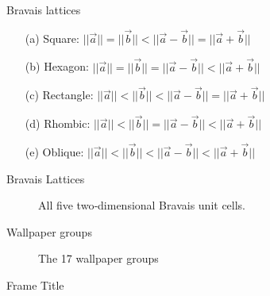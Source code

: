 \documentclass{beamer}
\theoremstyle{definition}
\begin{document}
\begin{frame}{Bravais lattices}
    \begin{enumerate}
        \item[(a)] Square:\hspace*{14pt} $||\vec{a}||=||\vec{b}|| < ||\vec{a}-\vec{b}|| = ||\vec{a}+\vec{b}||$

        \item[(b)] Hexagon:\hspace*{7pt} $||\vec{a}||=||\vec{b}|| = ||\vec{a}-\vec{b}|| < ||\vec{a}+\vec{b}||$

        \item[(c)] Rectangle: $||\vec{a}||<||\vec{b}|| < ||\vec{a}-\vec{b}|| = ||\vec{a}+\vec{b}||$

        \item[(d)] Rhombic:\hspace*{5pt} $||\vec{a}||<||\vec{b}|| = ||\vec{a}-\vec{b}|| < ||\vec{a}+\vec{b}||$

        \item[(e)] Oblique:\hspace*{9pt} $||\vec{a}||<||\vec{b}|| < ||\vec{a}-\vec{b}|| < ||\vec{a}+\vec{b}||$
    \end{enumerate}
\end{frame}

\begin{frame}{Bravais Lattices}
    \begin{figure}
        \centering
        
        \caption{All five two‐dimensional Bravais unit cells.}
        \label{fig:bravis-lattices}
    \end{figure}
\end{frame}



\begin{frame}{Wallpaper groups}
    \begin{figure}
        \centering
        
        \caption{The 17 wallpaper groups }
        \label{fig:17WallpaperGroups}
    \end{figure}
\end{frame}

\begin{frame}{Frame Title}
    
\end{frame}
\end{document}
